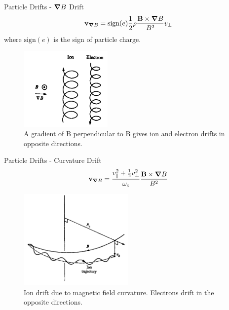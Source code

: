 \begin{frame}{Particle Drifts - $\grad B$ Drift}
    \begin{equation}
        \mathbf{v}_{\grad B} = \text{sign}(e)\frac{1}{2}\rho\frac{\mathbf{B}\times\grad B}{B^2}v_\perp
        \label{eq:grad-b-drift}
    \end{equation}
    where $\text{sign}(e)$ is the sign of particle charge.
    \begin{figure}
        \centering
        \includegraphics[width=0.4\textwidth]{figures/grad-b-drift.png}
        \caption{A gradient of B perpendicular to B gives ion and electron drifts in opposite directions.}
        \label{fig:grad-b-drift}
    \end{figure}
\end{frame}

\begin{frame}{Particle Drifts - Curvature Drift}
    \begin{equation}
        \mathbf{v}_{\grad B} = \frac{v_\parallel^2 + \frac{1}{2}v_\perp^2}{\omega_c}\frac{\mathbf{B}\times\grad B}{B^2}
        \label{eq:curvature-drift}
    \end{equation}
    \begin{figure}
        \centering
        \includegraphics[width=0.5\textwidth]{figures/curvature-drift.png}
        \caption{Ion drift due to magnetic field curvature. Electrons drift in the opposite directions.}
        \label{fig:}
    \end{figure}
\end{frame}

